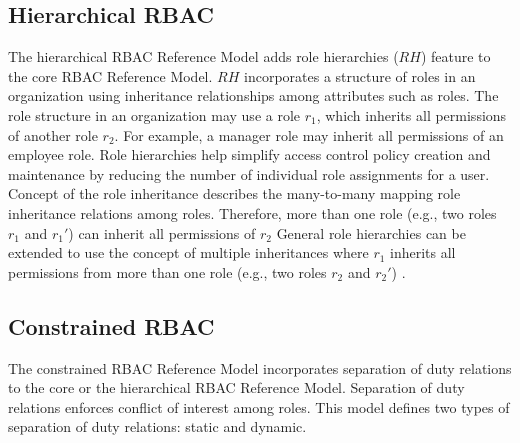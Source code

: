 \subsection{Hierarchical RBAC} 

The hierarchical RBAC Reference Model adds role hierarchies ($RH$) feature to the core RBAC Reference Model.
$RH$ incorporates a structure of roles in an organization using inheritance relationships among attributes such as roles.
The role structure in an organization may use
a role $r_1$, which inherits all permissions of another role $r_2$.
For example, a manager role may inherit all permissions of an employee role.
Role hierarchies help simplify access control policy creation and maintenance by reducing the number of
individual role assignments for a user. 
Concept of the role inheritance describes the many-to-many mapping role inheritance relations among roles.
Therefore, more than one role (e.g., two roles $r_1$ and $r_1'$) can inherit all permissions of $r_2$ 
General role hierarchies can be extended to use the concept of multiple inheritances where
$r_1$ inherits all permissions from more than one role (e.g., two roles $r_2$ and $r_2'$) .


\subsection{Constrained RBAC}

The constrained RBAC Reference Model incorporates separation of duty relations to  the core or the hierarchical RBAC Reference Model. Separation of 
duty relations enforces conflict of interest among roles. This model defines two types of separation of duty relations: static and dynamic.

